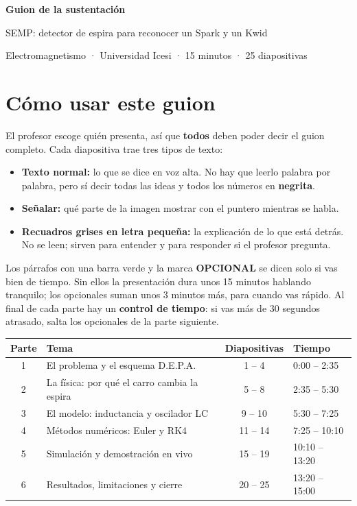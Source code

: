 \documentclass[11pt,a4paper]{article}
\begin{document}
\begin{center}
{\LARGE\bfseries\color{AzulIcesi} Guion de la sustentación}\par\vspace{4pt}
{\large SEMP: detector de espira para reconocer un Spark y un Kwid}\par\vspace{2pt}
{\color{GrisTexto} Electromagnetismo · Universidad Icesi · 15 minutos · 25 diapositivas}
\end{center}

\section*{Cómo usar este guion}

El profesor escoge quién presenta, así que \textbf{todos} deben poder decir el guion completo. Cada diapositiva
trae tres tipos de texto:

\begin{itemize}[leftmargin=1.2em, itemsep=2pt]
 \item \textbf{Texto normal:} lo que se dice en voz alta. No hay que leerlo palabra por palabra, pero sí decir
       todas las ideas y todos los números en \textbf{negrita}.
 \item {\color{AzulIcesi}\textbf{Señalar:}} qué parte de la imagen mostrar con el puntero mientras se habla.
 \item \textbf{Recuadros grises en letra pequeña:} la explicación de lo que está detrás. No se leen; sirven para
       entender y para responder si el profesor pregunta.
\end{itemize}

Los párrafos con una barra verde y la marca {\color{VerdeIcesi}\scriptsize\bfseries OPCIONAL} se dicen solo si
vas bien de tiempo. Sin ellos la presentación dura unos 15 minutos hablando tranquilo; los opcionales suman unos
3 minutos más, para cuando vas rápido. Al final de cada parte hay
un \textbf{control de tiempo}: si vas más de 30 segundos atrasado, salta los opcionales de la parte siguiente.

\begin{center}
\begin{tabular}{@{}clcl@{}}
\toprule
Parte & Tema & Diapositivas & Tiempo \\
\midrule
1 & El problema y el esquema D.E.P.A. & 1 -- 4 & 0:00 -- 2:35 \\
2 & La física: por qué el carro cambia la espira & 5 -- 8 & 2:35 -- 5:30 \\
3 & El modelo: inductancia y oscilador LC & 9 -- 10 & 5:30 -- 7:25 \\
4 & Métodos numéricos: Euler y RK4 & 11 -- 14 & 7:25 -- 10:10 \\
5 & Simulación y demostración en vivo & 15 -- 19 & 10:10 -- 13:20 \\
6 & Resultados, limitaciones y cierre & 20 -- 25 & 13:20 -- 15:00 \\
\bottomrule
\end{tabular}
\end{center}
\end{document}
